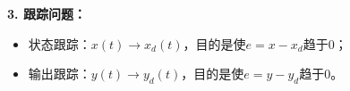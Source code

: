 \textbf{3. 跟踪问题：}
\begin{itemize}[leftmargin=1em]
    \item 状态跟踪：$x(t) \rightarrow x_d (t)$，目的是使$e = x - x_d$趋于$0$；
    \item 输出跟踪：$y(t) \rightarrow y_d (t)$，目的是使$e = y - y_d$趋于$0$。
\end{itemize}